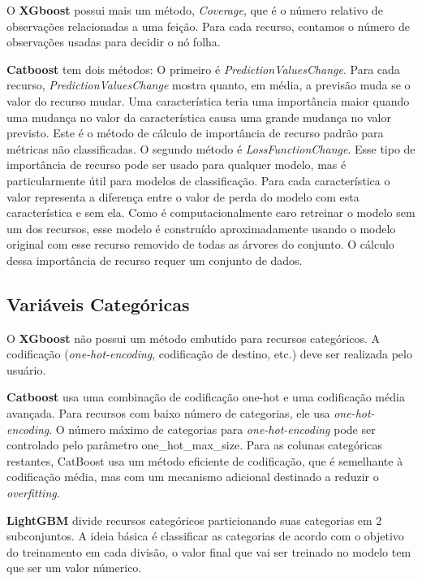 O \textbf{XGboost} possui mais um método, \textit{Coverage}, que é o número relativo de observações relacionadas a uma feição. Para cada recurso, contamos o número de observações usadas para decidir o nó folha.

\textbf{Catboost} tem dois métodos: O primeiro é \textit{PredictionValuesChange}. Para cada recurso, \textit{PredictionValuesChange} mostra quanto, em média, a previsão muda se o valor do recurso mudar. Uma característica teria uma importância maior quando uma mudança no valor da característica causa uma grande mudança no valor previsto. Este é o método de cálculo de importância de recurso padrão para métricas não classificadas. O segundo método é \textit{LossFunctionChange}. Esse tipo de importância de recurso pode ser usado para qualquer modelo, mas é particularmente útil para modelos de classificação. Para cada característica o valor representa a diferença entre o valor de perda do modelo com esta característica e sem ela. Como é computacionalmente caro retreinar o modelo sem um dos recursos, esse modelo é construído aproximadamente usando o modelo original com esse recurso removido de todas as árvores do conjunto. O cálculo dessa importância de recurso requer um conjunto de dados.

\subsection{Variáveis Categóricas}
O \textbf{XGboost} não possui um método embutido para recursos categóricos. A codificação (\textit{one-hot-encoding}, codificação de destino, etc.) deve ser realizada pelo usuário.

\textbf{Catboost} usa uma combinação de codificação one-hot e uma codificação média avançada. Para recursos com baixo número de categorias, ele usa \textit{one-hot-encoding}. O número máximo de categorias para \textit{one-hot-encoding} pode ser controlado pelo parâmetro one\_hot\_max\_size. Para as colunas categóricas restantes, CatBoost usa um método eficiente de codificação, que é semelhante à codificação média, mas com um mecanismo adicional destinado a reduzir o \textit{overfitting}.

\textbf{LightGBM} divide recursos categóricos particionando suas categorias em 2 subconjuntos. A ideia básica é classificar as categorias de acordo com o objetivo do treinamento em cada divisão, o valor final que vai ser treinado no modelo tem que ser um valor númerico.

